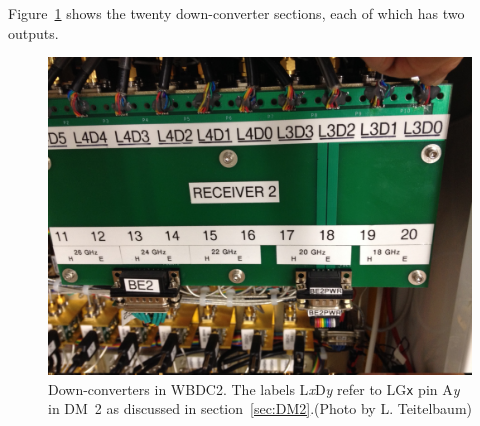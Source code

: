 \documentclass[letterpaper,11pt]{book}
\begin{document}
Figure~\ref{fig:downconv} shows the twenty down-converter sections, each of
which has two outputs.
\begin{figure}[h!tb]
  \begin{center}
    \includegraphics[width=6in]{WBDC2downconv.jpg}
    \caption[Down-converters in WBDC2]{\label{fig:downconv}Down-converters in 
    WBDC2.  The labels  L{\it x}D{\it y}
    refer to LG{\tt x} pin A{\it y} in DM~2 as discussed in 
    section~\ref{sec:DM2}.(Photo by L. Teitelbaum)}
  \end{center}
\end{figure}
\end{document}
